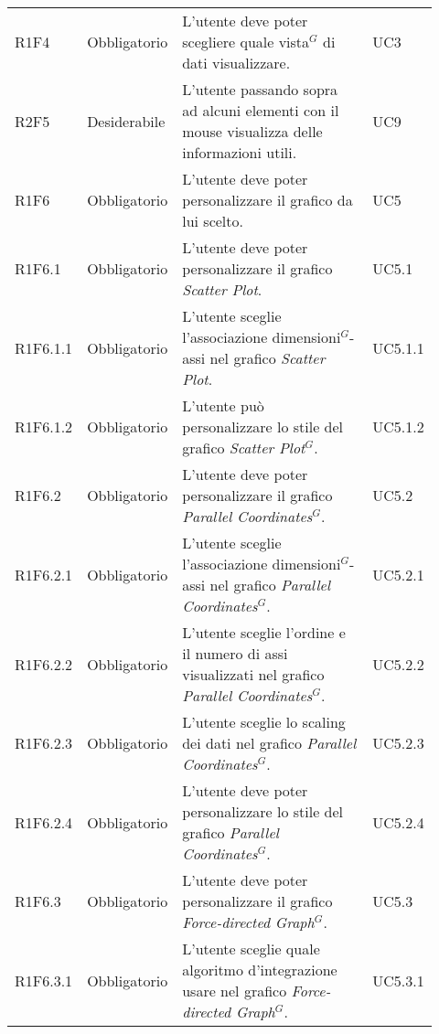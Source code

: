 {\begin{longtable}{p{0.12\linewidth}p{0.15\linewidth}p{0.50\linewidth}p{0.15\linewidth}}
    \rowcolor[RGB]{216, 235, 171}
    R1F4 & Obbligatorio & L'utente deve poter scegliere quale vista$^{G}$ di dati visualizzare. & UC3\\
    
    \rowcolor[RGB]{233, 245, 206}
    R2F5 & Desiderabile & L'utente passando sopra ad alcuni elementi con il mouse visualizza delle informazioni utili. & UC9\\
    
    \rowcolor[RGB]{216, 235, 171}
    R1F6 & Obbligatorio & L'utente deve poter personalizzare il grafico da lui scelto. & UC5\\
    \rowcolor[RGB]{233, 245, 206}
    R1F6.1 & Obbligatorio & L'utente deve poter personalizzare il grafico \textit{Scatter Plot}. & UC5.1\\
    \rowcolor[RGB]{216, 235, 171}
    R1F6.1.1 & Obbligatorio & L'utente sceglie l'associazione dimensioni$^{G}$-assi nel grafico \textit{Scatter Plot}. & UC5.1.1\\
    \rowcolor[RGB]{233, 245, 206}
    R1F6.1.2 & Obbligatorio & L'utente può personalizzare lo stile del grafico \textit{Scatter Plot$^{G}$}. & UC5.1.2\\
    \rowcolor[RGB]{216, 235, 171}
    R1F6.2 & Obbligatorio & L'utente deve poter personalizzare il grafico \textit{Parallel Coordinates$^{G}$}. & UC5.2\\
    \rowcolor[RGB]{233, 245, 206}
    R1F6.2.1 & Obbligatorio & L'utente sceglie l'associazione dimensioni$^{G}$-assi nel grafico \textit{Parallel Coordinates$^{G}$}. & UC5.2.1\\
    \rowcolor[RGB]{216, 235, 171}
    R1F6.2.2 & Obbligatorio & L'utente sceglie l'ordine e il numero di assi visualizzati nel grafico \textit{Parallel Coordinates$^{G}$}. & UC5.2.2\\
    \rowcolor[RGB]{233, 245, 206}
    R1F6.2.3 & Obbligatorio & L'utente sceglie lo scaling dei dati nel grafico \textit{Parallel Coordinates$^{G}$}. & UC5.2.3\\
    \rowcolor[RGB]{216, 235, 171}
    R1F6.2.4 & Obbligatorio & L'utente deve poter personalizzare lo stile del grafico \textit{Parallel Coordinates$^{G}$}. & UC5.2.4\\
    \rowcolor[RGB]{233, 245, 206}
    R1F6.3 & Obbligatorio & L'utente deve poter personalizzare il grafico \textit{Force-directed Graph$^{G}$}. & UC5.3\\
    \rowcolor[RGB]{216, 235, 171}
    R1F6.3.1 & Obbligatorio & L'utente sceglie quale algoritmo d'integrazione usare nel grafico \textit{Force-directed Graph$^{G}$}. & UC5.3.1\\

\end{longtable}}
